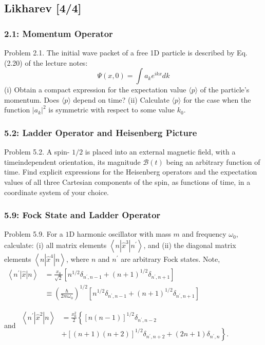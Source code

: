\documentclass[11pt]{article}
\begin{document}
\subsection{Likharev [4/4]}
\label{sec:orgf393df3}
\subsubsection{2.1: Momentum Operator}
\label{sec:org41d2b2a}
Problem 2.1. The initial wave packet of a free 1D particle is described by Eq. (2.20) of the lecture notes:
$$
\Psi(x, 0)=\int a_k e^{i k x} d k
$$
(i) Obtain a compact expression for the expectation value \(\langle p\rangle\) of the particle's momentum. Does \(\langle p\rangle\) depend on time?
(ii) Calculate \(\langle p\rangle\) for the case when the function \(\left|a_k\right|^2\) is symmetric with respect to some value \(k_0\).
\subsubsection{5.2: Ladder Operator and Heisenberg Picture}
\label{sec:org3f1fa14}
Problem 5.2. A spin- \(1 / 2\) is placed into an external magnetic field, with a
timeindependent orientation, its magnitude \(\mathscr{B}(t)\) being an arbitrary
function of time. Find explicit expressions for the Heisenberg operators and the
expectation values of all three Cartesian components of the spin, as functions
of time, in a coordinate system of your choice.
\subsubsection{5.9: Fock State and Ladder Operator}
\label{sec:orgf7d6cca}
Problem 5.9. For a \(1 \mathrm{D}\) harmonic oscillator with mass \(m\) and
frequency \(\omega_0\), calculate: (i) all matrix elements \(\left\langle
n\left|\hat{x}^3\right| n^{\prime}\right\rangle\), and (ii) the diagonal matrix
elements \(\left\langle n\left|\hat{x}^4\right| n\right\rangle\), where \(n\) and
\(n^{\prime}\) are arbitrary Fock states. Note,
\(\begin{aligned}
\left\langle n^{\prime}|\hat{x}| n\right\rangle & =\frac{x_0}{\sqrt{2}}\left[n^{1 / 2} \delta_{n^{\prime}, n-1}+(n+1)^{1 / 2} \delta_{n^{\prime}, n+1}\right] \\
& \equiv\left(\frac{\hbar}{2 m \omega_0}\right)^{1 / 2}\left[n^{1 / 2} \delta_{n^{\prime}, n-1}+(n+1)^{1 / 2} \delta_{n^{\prime}, n+1}\right]
\end{aligned}\)


and \(\begin{aligned}
\left\langle n^{\prime}|\hat{x}^{2}| n\right\rangle & = \frac{x_0^2}{2}\left\{[n(n-1)]^{1 / 2} \delta_{n^{\prime}, n-2}\right. \\
& \left.+[(n+1)(n+2)]^{1 / 2} \delta_{n^{\prime}, n+2}+(2 n+1) \delta_{n^{\prime}, n}\right\} .
\end{aligned}\)
\end{document}
